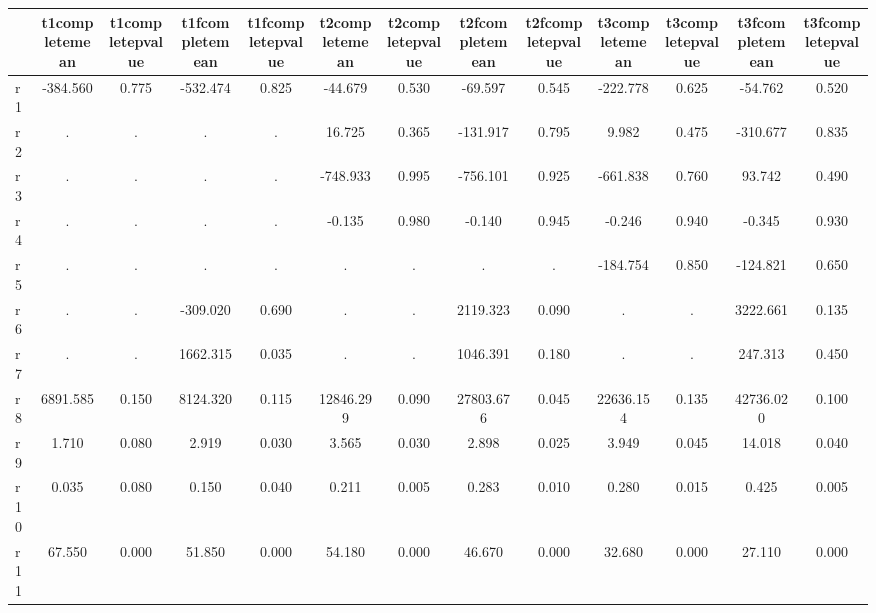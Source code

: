 \begin{table}[htbp]
\begin{tabular}{lcccccccccccc} \hline \hline
 & t1completemean  & t1completepvalue  & t1fcompletemean  & t1fcompletepvalue  & t2completemean  & t2completepvalue  & t2fcompletemean  & t2fcompletepvalue  & t3completemean  & t3completepvalue  & t3fcompletemean  & t3fcompletepvalue  \\  \hline 
r1 &  -384.560 &     0.775 &  -532.474 &     0.825 &   -44.679 &     0.530 &   -69.597 &     0.545 &  -222.778 &     0.625 &   -54.762 &     0.520 \\  
r2 &         . &         . &         . &         . &    16.725 &     0.365 &  -131.917 &     0.795 &     9.982 &     0.475 &  -310.677 &     0.835 \\  
r3 &         . &         . &         . &         . &  -748.933 &     0.995 &  -756.101 &     0.925 &  -661.838 &     0.760 &    93.742 &     0.490 \\  
r4 &         . &         . &         . &         . &    -0.135 &     0.980 &    -0.140 &     0.945 &    -0.246 &     0.940 &    -0.345 &     0.930 \\  
r5 &         . &         . &         . &         . &         . &         . &         . &         . &  -184.754 &     0.850 &  -124.821 &     0.650 \\  
r6 &         . &         . &  -309.020 &     0.690 &         . &         . &  2119.323 &     0.090 &         . &         . &  3222.661 &     0.135 \\  
r7 &         . &         . &  1662.315 &     0.035 &         . &         . &  1046.391 &     0.180 &         . &         . &   247.313 &     0.450 \\  
r8 &  6891.585 &     0.150 &  8124.320 &     0.115 & 12846.299 &     0.090 & 27803.676 &     0.045 & 22636.154 &     0.135 & 42736.020 &     0.100 \\  
r9 &     1.710 &     0.080 &     2.919 &     0.030 &     3.565 &     0.030 &     2.898 &     0.025 &     3.949 &     0.045 &    14.018 &     0.040 \\  
r10 &     0.035 &     0.080 &     0.150 &     0.040 &     0.211 &     0.005 &     0.283 &     0.010 &     0.280 &     0.015 &     0.425 &     0.005 \\  
r11 &    67.550 &     0.000 &    51.850 &     0.000 &    54.180 &     0.000 &    46.670 &     0.000 &    32.680 &     0.000 &    27.110 &     0.000 \\  
\hline \hline \end{tabular}
\end{table}
